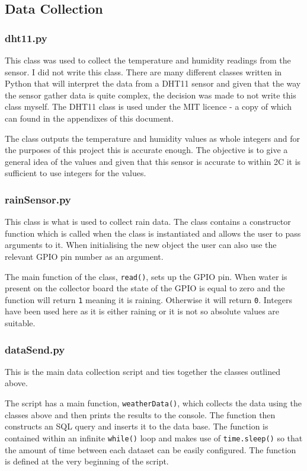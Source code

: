 \documentclass[10pt,a4paper]{article}
\begin{document}
\subsection{Data Collection}
\subsubsection{dht11.py}
This class was used to collect the temperature and humidity readings from the sensor. I did not write this class. There are many different classes written in Python that will interpret the data from a DHT11 sensor and given that the way the sensor gather data is quite complex, the decision was made to not write this class myself. The DHT11 class is used under the MIT licence - a copy of which can found in the appendixes of this document. 

The class outputs the temperature and humidity values as whole integers and for the purposes of this project this is accurate enough. The objective is to give a general idea of the values and given that this sensor is accurate to within 2\textdegree{}C it is sufficient to use integers for the values. 

\subsubsection{rainSensor.py}
This class is what is used to collect rain data. The class contains a constructor function which is called when the class is instantiated and allows the user to pass arguments to it. When initialising the new object the user can also use the relevant GPIO pin number as an argument. 

The main function of the class, \texttt{read()}, sets up the GPIO pin. When water is present on the collector board the state of the GPIO is equal to zero and the function will return \texttt{1} meaning it is raining. Otherwise it will return \texttt{0}. Integers have been used here as it is either raining or it is not so absolute values are suitable. 

\subsubsection{dataSend.py}
This is the main data collection script and ties together the classes outlined above. 

The script has a main function, \texttt{weatherData()}, which collects the data using the classes above and then prints the results to the console. The function then constructs an SQL query and inserts it to the data base. The function is contained within an infinite \texttt{while()} loop and makes use of  \texttt{time.sleep()} so that the amount of time between each dataset can be easily configured. The function is defined at the very beginning of the script. 
\end{document}
